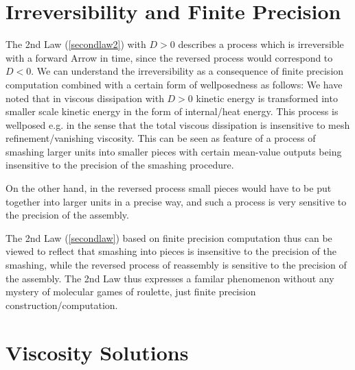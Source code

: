 
\section{Irreversibility and Finite Precision}

The 2nd Law (\ref{secondlaw2}) with $D>0$ describes 
a process which is irreversible with a forward Arrow in time,
since the reversed process would correspond to $D<0$. 
We can understand the irreversibility as a consequence 
of finite precision computation combined with a certain form
of wellposedness as follows: We have noted that in viscous dissipation
with $D>0$ kinetic energy is transformed
into smaller scale kinetic energy in the form of internal/heat energy.
This process is wellposed e.g. in the sense that the total viscous
dissipation is insensitive to mesh refinement/vanishing viscosity.
This can be seen as feature of a process of smashing larger units
into smaller pieces with certain mean-value outputs being insensitive 
to the precision of the smashing procedure.

On the other hand, in the reversed process small pieces would 
have to be put together into larger units in a precise way,
and such a process is very sensitive to the precision of the
assembly.

The 2nd Law (\ref{secondlaw}) based on finite precision computation
thus can be viewed to reflect that smashing into pieces is insensitive 
to the precision of the smashing, while the reversed process of reassembly 
is sensitive to the precision of the assembly. The 2nd Law thus 
expresses a familar phenomenon without any mystery of molecular
games of roulette, just finite precision construction/computation. 



\section{Viscosity Solutions}

